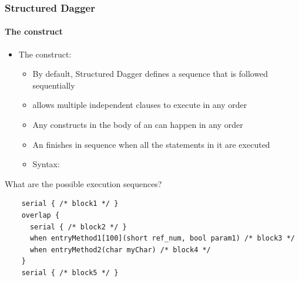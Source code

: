 
\begin{frame}[fragile]
  \frametitle{Structured Dagger}
  \framesubtitle{The  construct}
  \begin{itemize}
  \item The  construct:
    \begin{itemize}
    \item By default, Structured Dagger defines a sequence that is followed sequentially
    \item {} allows multiple independent clauses to execute in any order
    \item Any constructs in the body of an  can happen in any
      order
    \item An  finishes in sequence when all the statements in it
      are executed
    \item Syntax: 
    \end{itemize}
  \end{itemize}
  What are the possible execution sequences?
  \begin{lstlisting}
    serial { /* block1 */ }
    overlap {
      serial { /* block2 */ }
      when entryMethod1[100](short ref_num, bool param1) /* block3 */
      when entryMethod2(char myChar) /* block4 */
    }
    serial { /* block5 */ }
  \end{lstlisting}
\end{frame}

